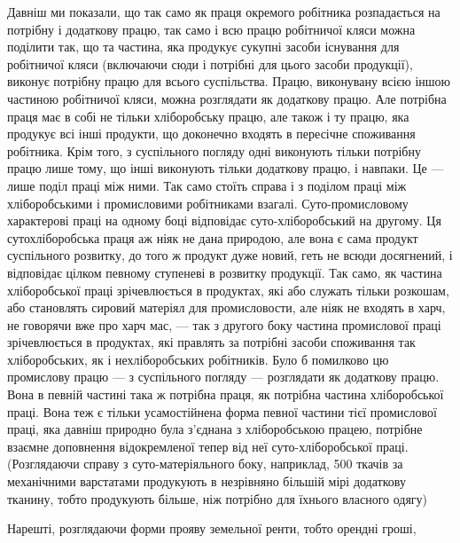 Давніш ми показали, що так само як праця окремого робітника розпадається
на потрібну і додаткову працю, так само і всю працю робітничої кляси можна
поділити так, що та частина, яка продукує сукупні засоби існування для робітничої
кляси (включаючи сюди і потрібні для цього засоби продукції), виконує потрібну
працю для всього суспільства. Працю, виконувану всією іншою частиною
робітничої кляси, можна розглядати як додаткову працю. Але потрібна праця
має в собі не тільки хліборобську працю, але також і ту працю, яка продукує
всі інші продукти, що доконечно входять в пересічне споживання робітника.
Крім того, з суспільного погляду одні виконують тільки потрібну працю лише
тому, що інші виконують тільки додаткову працю, і навпаки. Це — лише
поділ праці між ними. Так само стоїть справа і з поділом праці між хліборобськими
і промисловими робітниками взагалі. Суто-промисловому характерові
праці на одному боці відповідає суто-хліборобський на другому. Ця сутохліборобська
праця аж ніяк не дана природою, але вона є сама продукт
суспільного розвитку, до того ж продукт дуже новий, геть не всюди досягнений,
і відповідає цілком певному ступеневі в розвитку продукції. Так само, як частина
хліборобської праці зрічевлюється в продуктах, які або служать тільки розкошам,
або становлять сировий матеріял для промисловости, але ніяк не входять
в харч, не говорячи вже про харч мас, — так з другого боку частина промислової
праці зрічевлюється в продуктах, які правлять за потрібні засоби споживання
так хліборобських, як і нехліборобських робітників. Було б помилково цю
промислову працю — з суспільного погляду — розглядати як додаткову працю. Вона
в певній частині така ж потрібна праця, як потрібна частина хліборобської
праці. Вона теж є тільки усамостійнена форма певної частини тієї промислової
праці, яка давніш природно була з’єднана з хліборобською працею, потрібне взаємне
доповнення відокремленої тепер від неї суто-хліборобської праці. (Розглядаючи
справу з суто-матеріяльного боку, наприклад, 500 ткачів за механічними
варстатами продукують в незрівняно більшій мірі додаткову тканину, тобто
продукують більше, ніж потрібно для їхнього власного одягу)

Нарешті, розглядаючи форми прояву земельної ренти, тобто орендні гроші,
\parbreak{}  %
